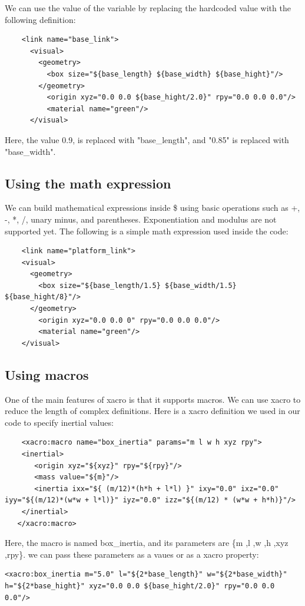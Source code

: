 \documentclass[../../main]{subfiles}
\begin{document}
We can use the value of the variable by replacing the hardcoded value with the following
definition:
\begin{verbatim}
    <link name="base_link">
      <visual>
        <geometry>
          <box size="${base_length} ${base_width} ${base_hight}"/>
        </geometry>
          <origin xyz="0.0 0.0 ${base_hight/2.0}" rpy="0.0 0.0 0.0"/>
          <material name="green"/>
      </visual>
\end{verbatim}

Here, the  value 0.9, is replaced with "{base\_length}", and "0.85" is
replaced with "{base\_width}".

\subsection{Using the math expression}
We can build mathematical expressions inside \${} using basic operations such as +, -, *,
/, unary minus, and parentheses. Exponentiation and modulus are not supported yet. The
following is a simple math expression used inside the code:

\begin{verbatim}
    <link name="platform_link">
    <visual>
      <geometry>
        <box size="${base_length/1.5} ${base_width/1.5} ${base_hight/8}"/>
      </geometry>
        <origin xyz="0.0 0.0 0" rpy="0.0 0.0 0.0"/>
        <material name="green"/>
    </visual>
\end{verbatim}

\subsection{Using macros}
One of the main features of xacro is that it supports macros. We can use xacro to reduce
the length of complex definitions. Here is a xacro definition we used in our code to
specify inertial values:
\begin{verbatim}
    <xacro:macro name="box_inertia" params="m l w h xyz rpy">
    <inertial>
       <origin xyz="${xyz}" rpy="${rpy}"/>
       <mass value="${m}"/>
       <inertia ixx="${ (m/12)*(h*h + l*l) }" ixy="0.0" ixz="0.0" iyy="${(m/12)*(w*w + l*l)}" iyz="0.0" izz="${(m/12) * (w*w + h*h)}"/>
    </inertial>
   </xacro:macro>
\end{verbatim}
Here, the macro is named box\_inertia, and its parameters are \{m ,l ,w ,h ,xyz ,rpy\}. we can pass these parameters as a vaues or as a xacro property:
\begin{verbatim}
<xacro:box_inertia m="5.0" l="${2*base_length}" w="${2*base_width}" h="${2*base_hight}" xyz="0.0 0.0 ${base_hight/2.0}" rpy="0.0 0.0 0.0"/>
\end{verbatim}
\end{document}
